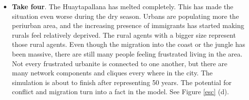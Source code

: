 \documentclass[doc,12pt,floatsintext]{apa7}
\begin{document}
\begin{itemize}

\item {\bf Take four}. The Huaytapallana has melted completely. This has made the situation even worse during the dry season. Urbans are populating more the periurban area, and the increasing presence of immigrants has started making rurals  feel relatively deprived. The rural agents with a bigger size represent those rural agents. Even though the migration into the coast or the jungle has been massive, there are still many people feeling frustrated living in the area. Not every frustrated urbanite is connected to one another, but there are many network components and cliques every where in the city. The simulation is about to finish after representing 50 years. The potential for conflict and migration turn into a fact in the model. See Figure \ref{esc} (d).



\end {itemize}
\end{document}
